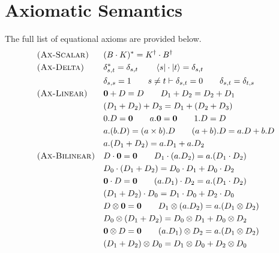 \section{Axiomatic Semantics}
\label{sec: full axioms}
The full list of equational axioms are provided below.
    \begin{align*}
        & \textsc{(Ax-Scalar)} &&
        (B \cdot K)^* = K^\dagger \cdot B^\dagger
        \\
            & \textsc{(Ax-Delta)} &&
        \delta_{s, t}^* = \delta_{s, t}
        \qquad
        \bra{s} \cdot \ket{t} = \delta_{s, t}
        \\ & &&
        \delta_{s, s} = 1
        \qquad
        s \neq t \vdash \delta_{s, t} = 0
        \qquad
        \delta_{s, t} = \delta_{t, s}
        \\
            & \textsc{(Ax-Linear)} &&
        \mathbf{0} + D = D
        \qquad
        D_1 + D_2 = D_2 + D_1
        \\ & &&
        (D_1 + D_2) + D_3 = D_1 + (D_2 + D_3)
        \\ & &&
        0.D = \mathbf{0}
        \qquad
        a.\mathbf{0} = \mathbf{0}
        \qquad
        1.D = D
        \\ & &&
        a.(b.D) = (a \times b).D
        \qquad
        (a + b).D = a.D + b.D
        \\ & &&
        a.(D_1 + D_2) = a.D_1 + a.D_2
        \\
        & \textsc{(Ax-Bilinear)} &&
        D \cdot \mathbf{0} = \mathbf{0} 
        \qquad
        D_1 \cdot (a.D_2) = a.(D_1 \cdot D_2)
        \\ & &&
        D_0 \cdot (D_1 + D_2) = D_0 \cdot D_1 + D_0 \cdot D_2
        \\ & &&
        \mathbf{0} \cdot D = \mathbf{0}
        \qquad
        (a.D_1) \cdot D_2 = a.(D_1 \cdot D_2)
        \\ & &&
        (D_1 + D_2) \cdot D_0 = D_1 \cdot D_0 + D_2 \cdot D_0
        \\ 
        & &&
        D \otimes \mathbf{0} = \mathbf{0}
        \qquad
        D_1 \otimes (a.D_2) = a.(D_1 \otimes D_2)
        \\ & &&
        D_0 \otimes (D_1 + D_2) = D_0 \otimes D_1 + D_0 \otimes D_2
        \\ & &&
        \mathbf{0} \otimes D = \mathbf{0} 
        \qquad
        (a.D_1) \otimes D_2 = a.(D_1 \otimes D_2)
        \\ & &&
        (D_1 + D_2) \otimes D_0 = D_1 \otimes D_0 + D_2 \otimes D_0

\end{align*}
